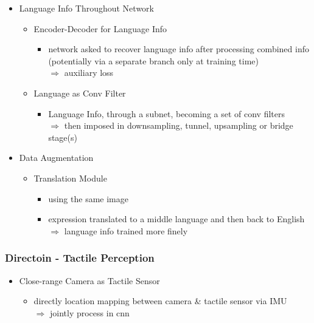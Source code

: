 \begin{itemize}
\begin{itemize}
\begin{itemize}
		\end{itemize}
	\end{itemize}
\item Language Info Throughout Network
	\begin{itemize}
	\item Encoder-Decoder for Language Info
		\begin{itemize}
		\item network asked to recover language info after processing combined info \\ 
		(potentially via a separate branch only at training time) \\ 
		$\Rightarrow$ auxiliary loss
		\end{itemize}
	\item Language as Conv Filter
		\begin{itemize}
		\item Language Info, through a subnet, becoming a set of conv filters \\
		$\Rightarrow$ then imposed in downsampling, tunnel, upsampling or bridge stage(s)
		\end{itemize}
	\end{itemize}
\item Data Augmentation
	\begin{itemize}
	\item Translation Module
		\begin{itemize}
		\item using the same image
		\item expression translated to a middle language and then back to English \\
		$\Rightarrow$ language info trained more finely
		\end{itemize}
	\end{itemize}
\end{itemize}
\subsubsection{Directoin - Tactile Perception}
\begin{itemize}
\item Close-range Camera as Tactile Sensor
	\begin{itemize}
	\item directly location mapping between camera \& tactile sensor via IMU \\
	$\Rightarrow$ jointly process in cnn
	\end{itemize}
\end{itemize}


